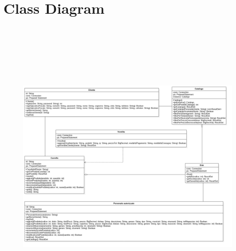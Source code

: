 \documentclass[a4paper,12pt]{report}
\begin{document}
	\chapter*{Class Diagram}
	\begin{figure}[h]
		\centering
		\includegraphics[width=17cm, height=15cm]{Class}
	\end{figure}
	
	
	
\end{document}
